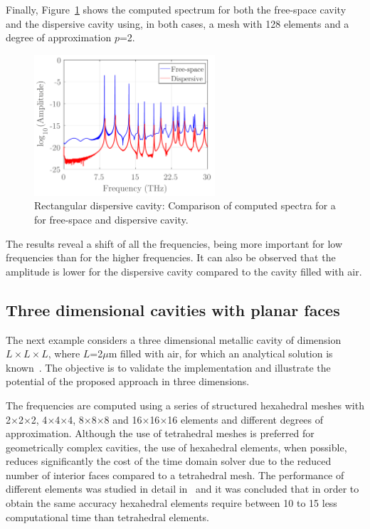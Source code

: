 Finally, Figure~\ref{fig:dispersiveFreeSpaceSpectrum} shows the computed spectrum for both the free-space cavity and the dispersive cavity using, in both cases, a mesh with 128 elements and a degree of approximation $p$=2. 
\begin{figure}[!ht]
\centering
\includegraphics[width=0.6\textwidth]{figs/dispersiveFreeSpaceSpectrum}
\caption{Rectangular dispersive cavity: Comparison of computed spectra for a for free-space and dispersive cavity.}
\label{fig:dispersiveFreeSpaceSpectrum}
\end{figure}
The results reveal a shift of all the frequencies, being more important for low frequencies than for the higher frequencies. It can also be observed that the amplitude is lower for the dispersive cavity compared to the cavity filled with air.


\clearpage
\subsection{Three dimensional cavities with planar faces}
The next example considers a three dimensional metallic cavity of dimension $L\times L \times L$, where $L$=2$\mu$m filled with air, for which an analytical solution is known~\cite{BalanisBook}. The objective is to validate the implementation and illustrate the potential of the proposed approach in three dimensions.  

The frequencies are computed using a series of structured hexahedral meshes with 2$\times$2$\times$2, 4$\times$4$\times$4, 8$\times$8$\times$8 and 16$\times$16$\times$16 elements and different degrees of approximation. Although the use of tetrahedral meshes is preferred for geometrically complex cavities, the use of hexahedral elements, when possible, reduces significantly the cost of the time domain solver due to the reduced number of interior faces compared to a tetrahedral mesh. The performance of different elements was studied in detail in~\cite{HybridMeshesCEM} and it was concluded that in order to obtain the same accuracy hexahedral elements require between 10 to 15 less computational time than tetrahedral elements.

